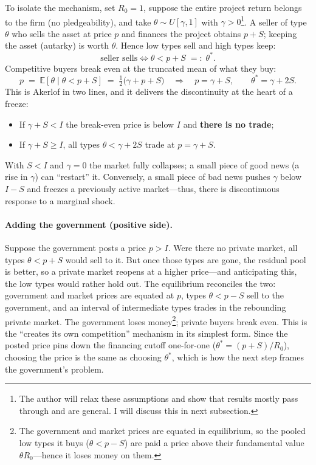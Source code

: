 \documentclass[11pt]{article}
\theoremstyle{definition}
\theoremstyle{plain}
\newcommand{\E}{\mathbb{E}}
\begin{document}
To isolate the mechanism, set $R_0=1$, suppose the entire project return belongs
to the firm (no pledgeability), and take $\theta\sim U[\gamma,1]$ with
$\gamma>0$\footnote{The author will relax these assumptions and show that results mostly pass through and are general. I will discuss this in next subsection.}. A seller of type $\theta$ who sells the asset at price $p$ and
finances the project obtains $p+S$; keeping the asset (autarky) is worth
$\theta$. Hence low types sell and high types keep:
\[
\text{seller sells} \iff \theta < p+S \;=:\; \theta^\ast .
\]
Competitive buyers break even at the truncated mean of what they buy:
\[
p \;=\; \E[\theta \mid \theta<p+S]
   \;=\; \tfrac12\big(\gamma + p + S\big)
   \quad\Longrightarrow\quad
   p = \gamma+S,\qquad \theta^\ast=\gamma+2S .
\]
This is Akerlof in two lines, and it delivers the discontinuity at the heart of
a freeze:
\begin{itemize}[nosep]
  \item If $\gamma+S<I$ the break-even price is below $I$ and \textbf{there is no
  trade};
  \item If $\gamma+S\ge I$, all types $\theta<\gamma+2S$ trade at $p=\gamma+S$.
\end{itemize}
With $S<I$ and $\gamma=0$ the market fully collapses; a small piece of
good news (a rise in $\gamma$) can ``restart'' it. Conversely, a small piece of
bad news pushes $\gamma$ below $I-S$ and freezes a previously active
market---thus, there is discontinuous response to a marginal shock.

\paragraph{Adding the government (positive side).} Suppose the government posts a price $p>I$.
Were there no private market, all types $\theta<p+S$ would sell to it. But once
those types are gone, the residual pool is better, so a private market reopens at
a higher price---and anticipating this, the low types would rather
hold out. The equilibrium reconciles the two: government and market prices
are equated at $p$, types $\theta<p-S$ sell to the government, and an interval of
intermediate types trades in the rebounding private market. The government loses
money\footnote{The government and market prices are equated in equilibrium, so the pooled low types it buys ($\theta<p-S$) are paid a price above their fundamental value $\theta R_0$---hence it loses money on them.}; private buyers break even. This is the ``creates its own competition''
mechanism in its simplest form. Since the posted price pins down the financing cutoff one-for-one ($\theta^\ast=(p+S)/R_0$), choosing the price is the same as choosing $\theta^\ast$, which is how the next step frames the government's problem.
\end{document}

